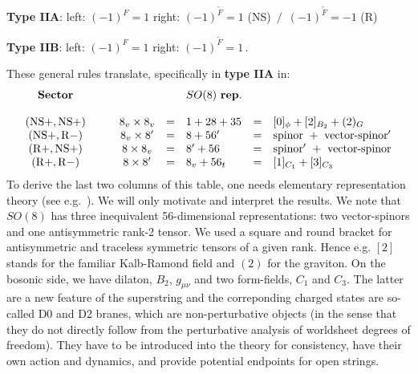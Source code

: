 \documentclass[12pt]{article}
\newcommand{\be}{\begin{equation}}
\newcommand{\ee}{\end{equation}}
\numberwithin{equation}{section}
\begin{document}
\noindent
{\bf Type IIA}: \hspace{1cm}left:\hspace{.5cm} $(-1)^F=1$ \hspace{1cm}right:\hspace{.5cm} $(-1)^{\tilde{F}}=1\,\,$(NS)$\,\,\,/\,\,\,
(-1)^{\tilde{F}}=-1\,\,$(R)

\noindent
{\bf Type IIB}: \hspace{1cm}left:\hspace{.5cm} $(-1)^F=1$ \hspace{1cm}right:\hspace{2.7cm} $(-1)^{\tilde{F}}=1\,.$

These general rules translate, specifically in {\bf type IIA} in:
\be
\begin{array}{ccclcl}
{\bf Sector} &&& SO(8)\,\,{\bf rep.} &&
\\
\\
{\rm (NS+,NS+)} & \qquad 8_v\times 8_v &=& 1+28+35 &=& [0]_\phi+[2]_{B_2}+(2)_G
\\
{\rm (NS+,R-)} & \qquad 8_v\times 8' &=& 8+56' &=& {\rm spinor}\,\,+\,\,{\rm vector\mbox{-}spinor}'
\\
{\rm (R+,NS+)} & \qquad 8\times 8_v &=&  8'+56 &=& {\rm spinor}'\,\,+\,\,{\rm vector\mbox{-}spinor}
\\
{\rm (R+,R-)} & \qquad 8\times 8' &=& 8_v+56_t &=& [1]_{C_1}+[3]_{C_3}
\end{array}\nonumber
\ee
To derive the last two columns of this table, one needs elementary representation theory (see e.g.~\cite{Slansky:1981yr}). We will only motivate and interpret the results. We note that $SO(8)$ has three inequivalent 56-dimensional representations: two vector-spinors and one antisymmetric rank-2 tensor. We used a square and round bracket for antisymmetric and traceless symmetric tensors of a given rank. Hence e.g. $[2]$ stands for the familiar Kalb-Ramond field and $(2)$ for the graviton. On the bosonic side, we have dilaton, $B_2$, $g_{\mu\nu}$ and two form-fields, $C_1$ and $C_3$. The latter are a new feature of the superstring and the correponding charged states are so-called D0 and D2 branes, which are non-perturbative objects (in the sense that they do not directly follow from the perturbative analysis of worldsheet degrees of freedom). They have to be introduced into the theory for consistency, have their own action and dynamics, and provide potential endpoints for open strings. 
\end{document}

